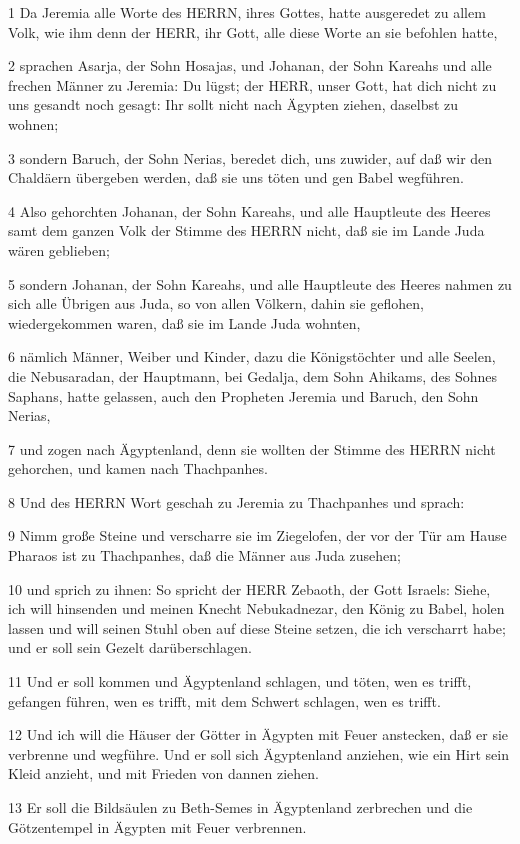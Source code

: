 \par 1 Da Jeremia alle Worte des HERRN, ihres Gottes, hatte ausgeredet zu allem Volk, wie ihm denn der HERR, ihr Gott, alle diese Worte an sie befohlen hatte,
\par 2 sprachen Asarja, der Sohn Hosajas, und Johanan, der Sohn Kareahs und alle frechen Männer zu Jeremia: Du lügst; der HERR, unser Gott, hat dich nicht zu uns gesandt noch gesagt: Ihr sollt nicht nach Ägypten ziehen, daselbst zu wohnen;
\par 3 sondern Baruch, der Sohn Nerias, beredet dich, uns zuwider, auf daß wir den Chaldäern übergeben werden, daß sie uns töten und gen Babel wegführen.
\par 4 Also gehorchten Johanan, der Sohn Kareahs, und alle Hauptleute des Heeres samt dem ganzen Volk der Stimme des HERRN nicht, daß sie im Lande Juda wären geblieben;
\par 5 sondern Johanan, der Sohn Kareahs, und alle Hauptleute des Heeres nahmen zu sich alle Übrigen aus Juda, so von allen Völkern, dahin sie geflohen, wiedergekommen waren, daß sie im Lande Juda wohnten,
\par 6 nämlich Männer, Weiber und Kinder, dazu die Königstöchter und alle Seelen, die Nebusaradan, der Hauptmann, bei Gedalja, dem Sohn Ahikams, des Sohnes Saphans, hatte gelassen, auch den Propheten Jeremia und Baruch, den Sohn Nerias,
\par 7 und zogen nach Ägyptenland, denn sie wollten der Stimme des HERRN nicht gehorchen, und kamen nach Thachpanhes.
\par 8 Und des HERRN Wort geschah zu Jeremia zu Thachpanhes und sprach:
\par 9 Nimm große Steine und verscharre sie im Ziegelofen, der vor der Tür am Hause Pharaos ist zu Thachpanhes, daß die Männer aus Juda zusehen;
\par 10 und sprich zu ihnen: So spricht der HERR Zebaoth, der Gott Israels: Siehe, ich will hinsenden und meinen Knecht Nebukadnezar, den König zu Babel, holen lassen und will seinen Stuhl oben auf diese Steine setzen, die ich verscharrt habe; und er soll sein Gezelt darüberschlagen.
\par 11 Und er soll kommen und Ägyptenland schlagen, und töten, wen es trifft, gefangen führen, wen es trifft, mit dem Schwert schlagen, wen es trifft.
\par 12 Und ich will die Häuser der Götter in Ägypten mit Feuer anstecken, daß er sie verbrenne und wegführe. Und er soll sich Ägyptenland anziehen, wie ein Hirt sein Kleid anzieht, und mit Frieden von dannen ziehen.
\par 13 Er soll die Bildsäulen zu Beth-Semes in Ägyptenland zerbrechen und die Götzentempel in Ägypten mit Feuer verbrennen.

